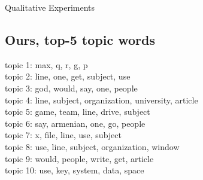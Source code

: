 \documentclass[10pt,pdf,hyperref={unicode}]{beamer}
\begin{document}
\begin{frame}{Qualitative Experiments}
\begin{multicols}{2}
\section*{Ours, top-5 topic words}
topic 1: max, q, r, g, p\\
topic 2: line, one, get, subject, use\\
topic 3: god, would, say, one, people\\
topic 4: line, subject, organization, university, article\\
topic 5: game, team, line, drive, subject\\
topic 6: say, armenian, one, go, people\\
topic 7: x, file, line, use, subject\\
topic 8: use, line, subject, organization, window\\
topic 9: would, people, write, get, article\\
topic 10: use, key, system, data, space\\
\end{multicols}
\end{frame}
\end{document}
